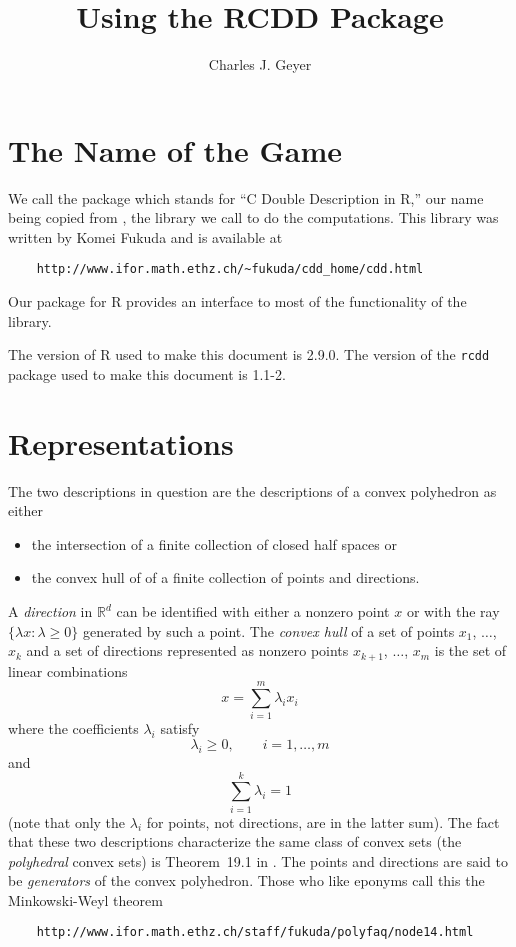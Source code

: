 \documentclass{article}
\newcommand{\real}{\mathbb{R}}
\begin{document}
\title{Using the RCDD Package}
\author{Charles J. Geyer}
\maketitle



\section{The Name of the Game}

We call the package \verb@rcdd@ which stands
for ``C Double Description in R,'' our name being copied from
\verb@cddlib@, the library we call to do the computations.
This library was written by Komei Fukuda and is available at
\begin{verbatim}
    http://www.ifor.math.ethz.ch/~fukuda/cdd_home/cdd.html
\end{verbatim}
Our \verb@rcdd@ package for R provides an interface to most
of the functionality of the \verb@cddlib@ library.

The version of R used to make this document is 2.9.0.  The version
of the \texttt{rcdd} package used to make this document is 1.1-2.

\section{Representations}

The two descriptions in question are the descriptions of a convex polyhedron
as either
\begin{itemize}
\item the intersection of a finite collection of closed half spaces or
\item the convex hull of of a finite collection of points and directions.
\end{itemize}

A \emph{direction} in $\real^d$ can be identified with
either a nonzero point $x$ or with
the ray $\{ \lambda x : \lambda \ge 0 \}$ generated by such a point.  
The \emph{convex hull} of a set of points $x_1$, $\ldots$, $x_k$ and
a set of directions represented as nonzero
points $x_{k + 1}$, $\ldots$, $x_m$ is the set of linear
combinations
$$
   x = \sum_{i = 1}^m \lambda_i x_i
$$
where the coefficients $\lambda_i$ satisfy
$$
   \lambda_i \ge 0, \qquad i = 1, \ldots, m
$$
and
$$
   \sum_{i = 1}^k \lambda_i = 1
$$
(note that only the $\lambda_i$ for points, not directions,
are in the latter sum).
The fact that these two descriptions characterize the same class of
convex sets (the \emph{polyhedral} convex sets) is Theorem~19.1
in \citet{rocky}.
The points and directions are said to be \emph{generators} of the
convex polyhedron.  Those who like eponyms call this the
Minkowski-Weyl theorem
\begin{verbatim}
    http://www.ifor.math.ethz.ch/staff/fukuda/polyfaq/node14.html
\end{verbatim}
\end{document}
